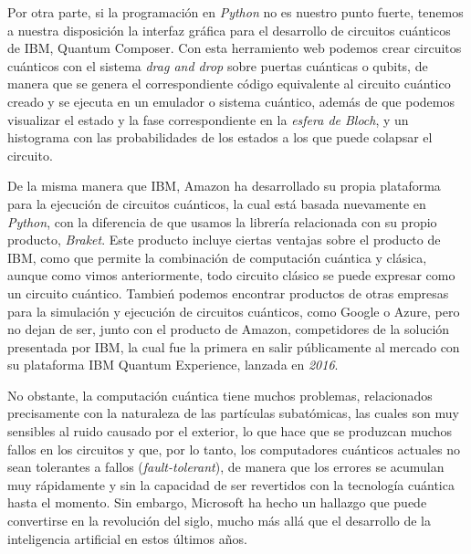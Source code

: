 \documentclass{article}
\numberwithin{equation}{section} %
\begin{document}
    \vspace{5mm}

    Por otra parte, si la programación en \textit{Python} no es nuestro punto fuerte, tenemos a nuestra disposición la interfaz gráfica para el desarrollo de circuitos cuánticos de IBM, Quantum Composer. Con esta herramiento web podemos crear circuitos cuánticos con el sistema \textit{drag and drop} sobre puertas cuánticas o qubits, de manera que se genera el correspondiente código equivalente al circuito cuántico creado y se ejecuta en un emulador o sistema cuántico, además de que podemos visualizar el estado y la fase correspondiente en la \textit{esfera de Bloch}, y un histograma con las probabilidades de los estados a los que puede colapsar el circuito.
    
    \vspace{5mm}

    De la misma manera que IBM, Amazon ha desarrollado su propia plataforma para la ejecución de circuitos cuánticos, la cual está basada nuevamente en \textit{Python}, con la diferencia de que usamos la librería relacionada con su propio producto, \textit{Braket}. Este producto incluye ciertas ventajas sobre el producto de IBM, como que permite la combinación de computación cuántica y clásica, aunque como vimos anteriormente, todo circuito clásico se puede expresar como un circuito cuántico. Tambień podemos encontrar productos de otras empresas para la simulación y ejecución de circuitos cuánticos, como Google o Azure, pero no dejan de ser, junto con el producto de Amazon, competidores de la solución presentada por IBM, la cual fue la primera en salir públicamente al mercado con su plataforma IBM Quantum Experience, lanzada en \textit{2016}.

    \vspace{5mm}

    No obstante, la computación cuántica tiene muchos problemas, relacionados precisamente con la naturaleza de las partículas subatómicas, las cuales son muy sensibles al ruido causado por el exterior, lo que hace que se produzcan muchos fallos en los circuitos y que, por lo tanto, los computadores cuánticos actuales no sean tolerantes a fallos (\textit{fault-tolerant}), de manera que los errores se acumulan muy rápidamente y sin la capacidad de ser revertidos con la tecnología cuántica hasta el momento. Sin embargo, Microsoft ha hecho un hallazgo que puede convertirse en la revolución del siglo, mucho más allá que el desarrollo de la inteligencia artificial en estos últimos años.
\end{document}
